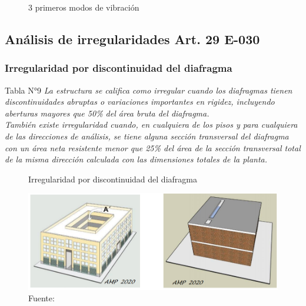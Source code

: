 \documentclass[12pt]{article}
\begin{document}
\begin{figure}[!htbp]
\begin{center}
{        \label{Imagen-Londres}}
    \caption{3 primeros modos de vibración}
    \label{Figura-Ciudades}
  \end{center}
\end{figure}
\newpage

\subsection{Análisis de irregularidades Art. 29 E-030}
\subsubsection{Irregularidad por discontinuidad del diafragma}
\begin{mybox2}{Tabla N°9}
\textit{La estructura se califica como irregular cuando los diafragmas 
tienen discontinuidades abruptas o variaciones importantes en 
rigidez, incluyendo aberturas mayores que 50\% del área bruta 
del diafragma.}\\
\textit{También  existe  irregularidad  cuando,  en  cualquiera de  los 
pisos y para cualquiera de las direcciones de análisis, se tiene 
alguna sección transversal del diafragma con un área neta 
resistente menor que 25\% del área de la sección transversal 
total de la misma dirección calculada con las dimensiones 
totales de la planta.}
\end{mybox2}

\begin{figure}[h!]
    \centering
    \caption{Irregularidad por discontinuidad del diafragma}
    \includegraphics[scale=0.7]{IMAGENES/20.PNG}
    \caption*{\small Fuente: \it \cite{comen}}
    \label{fig:my_label}
    
\end{figure}
\end{document}
